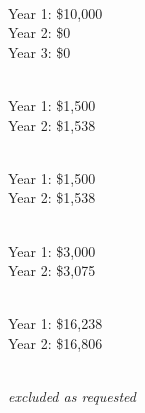 \documentclass[12pt, preprint]{hacked-aastex}
\begin{document}
\\
Year 1: \$10,000\\
Year 2: \$0\\
Year 3: \$0

\\
Year 1: \$1,500\\
Year 2: \$1,538

\\
Year 1: \$1,500\\
Year 2: \$1,538

\\
Year 1: \$3,000\\
Year 2: \$3,075

\\
Year 1: \$16,238\\
Year 2: \$16,806

\\
{\it excluded as requested}
\end{document}
